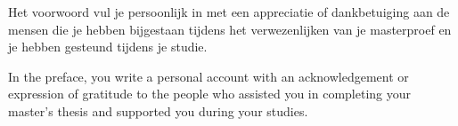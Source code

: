 Het voorwoord vul je persoonlijk in met een appreciatie of dankbetuiging aan de mensen die je hebben bijgestaan tijdens het verwezenlijken van je masterproef en je hebben gesteund tijdens je studie.

In the preface, you write a personal account with an acknowledgement or expression of gratitude to the people who assisted you in completing your master's thesis and supported you during your studies.